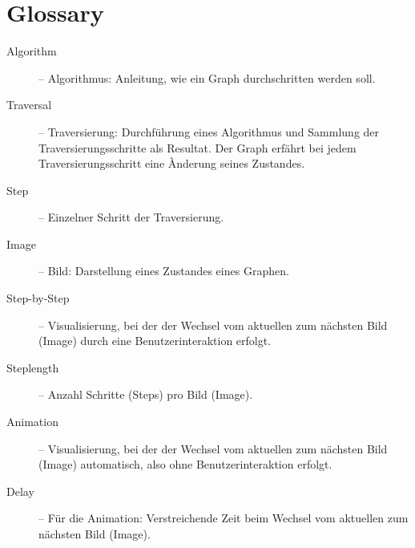 \section{Glossary}
\label{sec:Glossary}
\begin{description}
  \item[Algorithm] -- Algorithmus: Anleitung, wie ein Graph durchschritten werden soll.
  \item[Traversal] -- Traversierung: Durchf\"uhrung eines Algorithmus und Sammlung der Traversierungsschritte als Resultat. Der Graph erf\"ahrt bei jedem Traversierungsschritt eine \`Anderung seines Zustandes.
  \item[Step] -- Einzelner Schritt der Traversierung.
  \item[Image] -- Bild: Darstellung eines Zustandes eines Graphen.
  \item[Step-by-Step] -- Visualisierung, bei der der Wechsel vom aktuellen zum n\"achsten Bild (Image) durch eine Benutzerinteraktion erfolgt.
  \item[Steplength] -- Anzahl Schritte (Steps) pro Bild (Image).
  \item[Animation] -- Visualisierung, bei der der Wechsel vom aktuellen zum n\"achsten Bild (Image) automatisch, also ohne Benutzerinteraktion erfolgt.
  \item[Delay] -- F\"ur die Animation: Verstreichende Zeit beim Wechsel vom aktuellen zum n\"achsten Bild (Image).
\end{description}